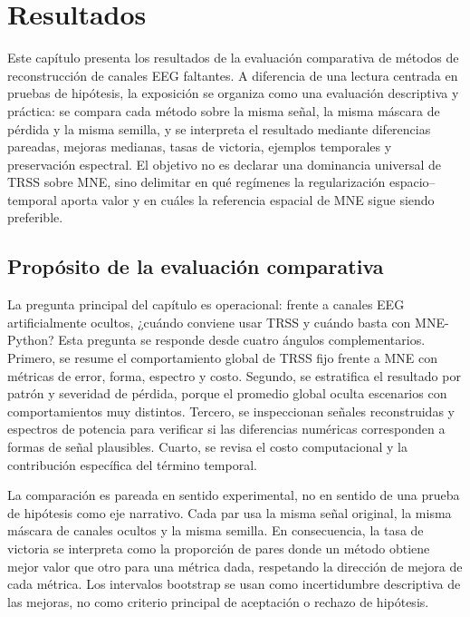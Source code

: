 \chapter{Resultados}
\label{ch:resultados}

Este capítulo presenta los resultados de la evaluación comparativa de métodos de reconstrucción de canales EEG faltantes. A diferencia de una lectura centrada en pruebas de hipótesis, la exposición se organiza como una evaluación descriptiva y práctica: se compara cada método sobre la misma señal, la misma máscara de pérdida y la misma semilla, y se interpreta el resultado mediante diferencias pareadas, mejoras medianas, tasas de victoria, ejemplos temporales y preservación espectral. El objetivo no es declarar una dominancia universal de TRSS sobre MNE, sino delimitar en qué regímenes la regularización espacio--temporal aporta valor y en cuáles la referencia espacial de MNE sigue siendo preferible.

\section{Propósito de la evaluación comparativa}

La pregunta principal del capítulo es operacional: frente a canales EEG artificialmente ocultos, ¿cuándo conviene usar TRSS y cuándo basta con MNE-Python? Esta pregunta se responde desde cuatro ángulos complementarios. Primero, se resume el comportamiento global de TRSS fijo frente a MNE con métricas de error, forma, espectro y costo. Segundo, se estratifica el resultado por patrón y severidad de pérdida, porque el promedio global oculta escenarios con comportamientos muy distintos. Tercero, se inspeccionan señales reconstruidas y espectros de potencia para verificar si las diferencias numéricas corresponden a formas de señal plausibles. Cuarto, se revisa el costo computacional y la contribución específica del término temporal.

La comparación es pareada en sentido experimental, no en sentido de una prueba de hipótesis como eje narrativo. Cada par usa la misma señal original, la misma máscara de canales ocultos y la misma semilla. En consecuencia, la tasa de victoria se interpreta como la proporción de pares donde un método obtiene mejor valor que otro para una métrica dada, respetando la dirección de mejora de cada métrica. Los intervalos bootstrap se usan como incertidumbre descriptiva de las mejoras, no como criterio principal de aceptación o rechazo de hipótesis.

